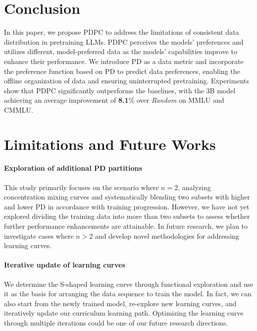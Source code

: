 \documentclass[11pt]{article}
\begin{document}
\section{Conclusion}
In this paper, we propose PDPC to address the limitations of consistent data distribution in pretraining LLMs. PDPC perceives the models' preferences and utilizes different, model-preferred data as the models' capabilities improve to enhance their performance. We introduce PD as a data metric and incorporate the preference function based on PD to predict data preferences, enabling the offline organization of data and ensuring uninterrupted pretraining. Experiments show that PDPC significantly outperforms the baselines, with the 3B model achieving an average improvement of \textbf{8.1}\% over \textit{Random} on MMLU and CMMLU. 

\section{Limitations and Future Works}
\paragraph{Exploration of additional PD partitions}  
This study primarily focuses on the scenario where \( n = 2 \), analyzing concentration mixing curves and systematically blending two subsets with higher and lower PD in accordance with training progression. However, we have not yet explored dividing the training data into more than two subsets to assess whether further performance enhancements are attainable. In future research, we plan to investigate cases where \( n > 2 \) and develop novel methodologies for addressing learning curves.

\paragraph{Iterative update of learning curves}  
We determine the S-shaped learning curve through functional exploration and use it as the basis for arranging the data sequence to train the model. In fact, we can also start from the newly trained model, re-explore new learning curves, and iteratively update our curriculum learning path. Optimizing the learning curve through multiple iterations could be one of our future research directions.

\end{document}

